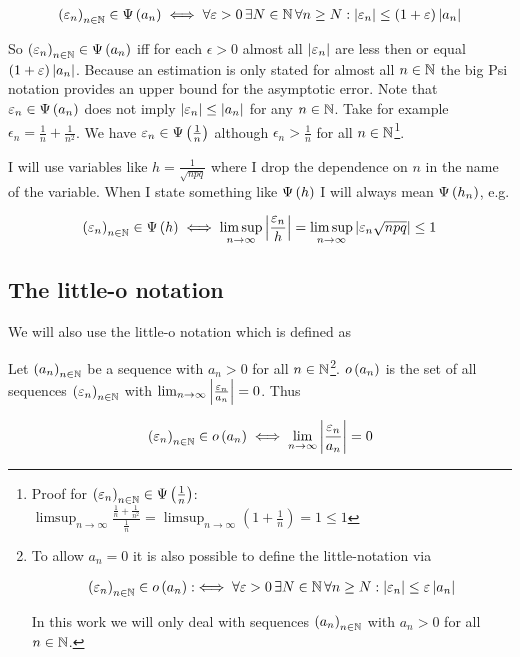 
\begin{align}
  \left({\varepsilon_n}\right)_{{n}\in\mathbb N} \in \Psi\left( {a_n} \right) \iff \forall \varepsilon > 0\, \exists N \in \mathbb N\, \forall n\ge N: \left|{\varepsilon_n}\right| \le (1+\varepsilon)\left|{a_n}\right|
\end{align}

So $\left({\varepsilon_n}\right)_{{n}\in\mathbb N}\in\Psi\left( {a_n} \right)$ iff for each $\epsilon > 0$ almost all $\left|{\varepsilon_n}\right|$ are less then or equal $(1+\varepsilon)\left|{a_n}\right|$. Because an estimation is only stated for almost all $n\in\mathbb N$ the big Psi notation provides an upper bound for the asymptotic error. Note that $\varepsilon_n\in\Psi\left( {a_n} \right)$ does not imply $\left|{\varepsilon_n}\right|\le\left|{a_n}\right|$ for any $n\in\mathbb N$. Take for example $\epsilon_n = \frac 1n + \frac 1{n^2}$. We have $\varepsilon_n \in \Psi\left( {\frac 1n} \right)$ although $\epsilon_n > \frac 1n$ for all $n\in\mathbb N$\footnote{Proof for $\left({\varepsilon_n}\right)_{{n}\in\mathbb N} \in \Psi\left( {\frac 1n} \right)$: $\limsup_{n\to\infty} \frac{\frac 1n + \frac 1{n^2}}{\frac 1n} = \limsup_{n\to\infty} \left(1+\frac 1n\right) = 1 \le 1$}.

I will use variables like $h=\frac{1}{\sqrt{npq}}$ where I drop the dependence on $n$ in the name of the variable. When I state something like $\Psi\left( {h} \right)$ I will always mean $\Psi\left( {h_n} \right)$, e.g.

\begin{align}
  \left({\varepsilon_n}\right)_{{n}\in\mathbb N} \in \Psi\left( {h} \right) \iff \limsup_{n\to\infty} \left|{\frac{\varepsilon_n}{h}}\right| = \limsup_{n\to\infty} \left|{\varepsilon_n \sqrt{npq}}\right| \le 1
\end{align}

\subsection{The little-o notation}

We will also use the little-o notation which is defined as~\cite[pp.~99,~103]{aigner}\cite[p.~385]{hachenberger}\cite{wiki:bigo}

\begin{definition}
  Let $\left({a_n}\right)_{{n}\in\mathbb N}$ be a sequence with $a_n > 0$ for all $n\in\mathbb N$\footnote{To allow $a_n=0$ it is also possible to define the little-notation via~\cite[pp.~448]{graham}\cite{wiki:bigo}

  \begin{align}
    \left({\varepsilon_n}\right)_{{n}\in\mathbb N}\in o\left( {a_n} \right) :\iff \forall \varepsilon > 0\, \exists N\in\mathbb N\, \forall n \ge N: \left|{\varepsilon_n}\right| \le \varepsilon \left|{a_n}\right|
  \end{align}

  \noindent In this work we will only deal with sequences $\left({a_n}\right)_{{n}\in\mathbb N}$ with $a_n > 0$ for all $n\in\mathbb N$.
}. $o\left( {a_n} \right)$ is the set of all sequences $\left({\varepsilon_n}\right)_{{n}\in\mathbb N}$ with $\lim_{n\to\infty} \left|{\frac{\varepsilon_n}{a_n}}\right| = 0$. Thus

  \begin{align}
    \left({\varepsilon_n}\right)_{{n}\in\mathbb N}\in o\left( {a_n} \right) \iff \lim_{n\to\infty} \left|{\frac{\varepsilon_n}{a_n}}\right| = 0
  \end{align}
\end{definition}

